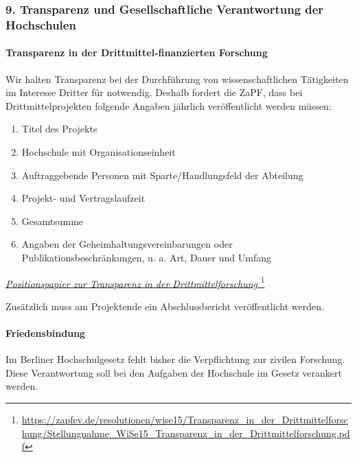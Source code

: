 \documentclass[DIV=calc]{scrartcl}
\begin{document}
\hypertarget{transparenz-und-gesellschaftliche-verantwortung-der-hochschulen}{%
\subsubsection*{9. Transparenz und Gesellschaftliche Verantwortung der Hochschulen}\label{transparenz-und-gesellschaftliche-verantwortung-der-hochschulen}}

\hypertarget{transparenz-in-der-drittmittel-finanzierten-forschung}{%
\paragraph{Transparenz in der Drittmittel-finanzierten Forschung}\label{transparenz-in-der-drittmittel-finanzierten-forschung}}

Wir halten Transparenz bei der Durchführung von wissenschaftlichen Tätigkeiten im Interesse Dritter für notwendig. Deshalb fordert die ZaPF, dass bei Drittmittelprojekten folgende Angaben jährlich veröffentlicht werden müssen:
\begin{enumerate}
\def\labelenumi{\arabic{enumi})}
\item Titel des Projekts
\item Hochschule mit Organisationseinheit
\item Auftraggebende Personen mit Sparte/Handlungsfeld der Abteilung
\item Projekt- und Vertragslaufzeit
\item Gesamtsumme
\item Angaben der Geheimhaltungsvereinbarungen oder Publikationsbeschränkungen, u. a. Art, Dauer und Umfang
\end{enumerate}

\href{https://zapfev.de/resolutionen/wise15/Transparenz_in_der_Drittmittelforschung/Stellungnahme_WiSe15_Transparenz_in_der_Drittmittelforschung.pdf}{\emph{Positionspapier zur Transparenz in der Drittmittelforschung
  }}\footnote{\url{https://zapfev.de/resolutionen/wise15/Transparenz_in_der_Drittmittelforschung/Stellungnahme_WiSe15_Transparenz_in_der_Drittmittelforschung.pdf}}

Zusätzlich muss am Projektende ein Abschlussbericht veröffentlicht werden.

\hypertarget{friedensbindung}{%
\paragraph{Friedensbindung}\label{friedensbindung}}
Im Berliner Hochschulgesetz fehlt bisher die Verpflichtung zur zivilen Forschung. Diese Verantwortung soll bei den Aufgaben der Hochschule im Gesetz verankert werden.
\end{document}
